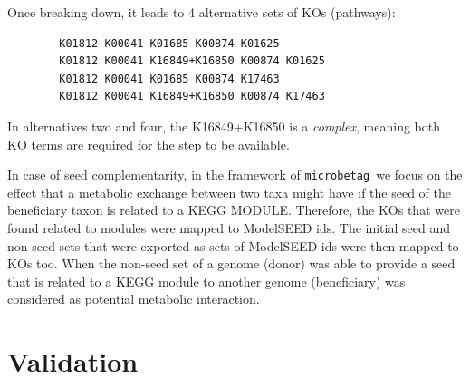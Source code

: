 \documentclass[sn-mathphys,Numbered]{sn-jnl}  %
\theoremstyle{thmstyleone}%
\theoremstyle{thmstyletwo}%
\theoremstyle{thmstylethree}%
\newcommand{\microbetag}{\texttt{microbetag }}
\begin{document}
\begin{appendices}
        Once breaking down, it leads to 4 alternative sets of KOs (pathways):

        \bigskip
        \begin{verbatim}
        K01812 K00041 K01685 K00874 K01625
        K01812 K00041 K16849+K16850 K00874 K01625
        K01812 K00041 K01685 K00874 K17463
        K01812 K00041 K16849+K16850 K00874 K17463
        \end{verbatim}
        \bigskip


        In alternatives two and four, the K16849+K16850 is a \textit{complex}, meaning both KO terms are required for the step to be available.


        In case of seed complementarity, in the framework of \microbetag we focus on the effect that a metabolic exchange between two taxa might have if the seed of the beneficiary taxon is related to a KEGG MODULE.
        Therefore, the KOs that were found related to modules were mapped to ModelSEED ids. 
        The initial seed and non-seed sets that were exported as sets of ModelSEED ids were then mapped to KOs too.
        When the non-seed set of a genome (donor) was able to provide a seed that is related to a KEGG module to another genome (beneficiary) was considered as potential metabolic interaction.




    \section{Validation}
    \label{app:val}


\end{appendices}
\end{document}
